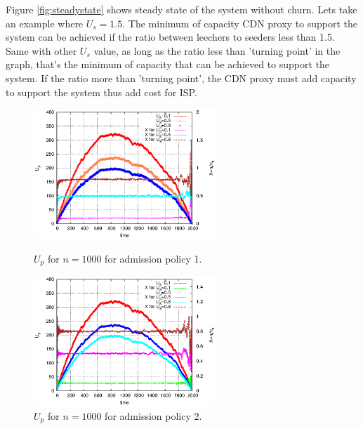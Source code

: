 \documentclass[paper]{ieice}
\begin{document}
Figure \ref{fig:steadystate} shows steady state of the system without churn.
Lets take an example where $U_s=1.5$. The minimum of capacity CDN proxy to support the system can be achieved if the ratio between leechers to seeders less than 1.5.
Same with other $U_s$ value, as long as the ratio less than 'turning point' in the graph, that's the minimum of capacity that can be achieved to support the system.  
If the ratio more than 'turning point', the CDN proxy must add capacity to support the system thus add cost for ISP.

\begin{figure}[thb]
\begin{minipage}[b]{0.4\linewidth}
\centering
\includegraphics[width=2.7in]{graphs/U_p_n_1000.eps}
\caption{$U_p$ for $n=1000$ for admission policy 1.}
\label{fig:U_p_1000_1}
\end{minipage}
\hspace{0.5cm}
\begin{minipage}[b]{0.5\linewidth}
\centering
\includegraphics[width=2.7in]{graphs/U_p_n_1000_admi.eps}
\caption{$U_p$ for $n=1000$ for admission policy 2.}
\label{fig:U_p_1000_2}
\end{minipage}
\end{figure}
\end{document}
